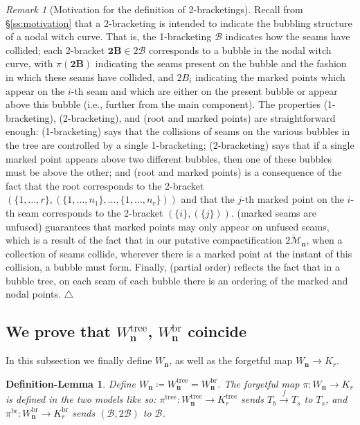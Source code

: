 \documentclass[11pt]{amsart}
\newtheorem{deflem}[theorem]{Definition-Lemma}
\theoremstyle{definition}
\theoremstyle{remark}
\newtheorem{remark}[theorem]{Remark}
\theoremstyle{plain}
\newcommand\cM{\mathcal{M}}
\newcommand\bn{\mathbf{n}}
\newcommand{\btB}{{\mathbf{2B}}}
\newcommand{\sB}{\mathscr{B}}
\newcommand{\stB}{2\mathscr{B}}
\newcommand{\on}{\operatorname}
\newcommand{\tree}{{\on{tree}}}
\newcommand{\br}{{\on{br}}}
\newcommand{\ol}{\overline}
\newcommand{\sr}{\stackrel}
\begin{document}
\begin{remark}[Motivation for the definition of 2-bracketings]
Recall from \S\ref{ss:motivation} that a 2-bracketing is intended to indicate the bubbling structure of a nodal witch curve.
That is, the 1-bracketing $\sB$ indicates how the seams have collided; each 2-bracket $\btB \in \stB$ corresponds to a bubble in the nodal witch curve, with $\pi(\btB)$ indicating the seams present on the bubble and the fashion in which these seams have collided, and $2B_i$ indicating the marked points which appear on the $i$-th seam and which are either on the present bubble or appear above this bubble (i.e., further from the main component).
The properties {\sc (1-bracketing)}, {\sc (2-bracketing)}, and {\sc (root and marked points)} are straightforward enough: {\sc (1-bracketing)} says that the collisions of seams on the various bubbles in the tree are controlled by a single 1-bracketing; {\sc (2-bracketing)} says that if a single marked point appears above two different bubbles, then one of these bubbles must be above the other; and {\sc (root and marked points)} is a consequence of the fact that the root corresponds to the 2-bracket $(\{1,\ldots,r\},(\{1,\ldots,n_1\},\ldots,\{1,\ldots,n_r\}))$ and that the $j$-th marked point on the $i$-th seam corresponds to the 2-bracket $(\{i\},(\{j\}))$.
{\sc (marked seams are unfused)} guarantees that marked points may only appear on unfused seams, which is a result of the fact that in our putative compactification $\ol{2\cM}_\bn$, when a collection of seams collide, wherever there is a marked point at the instant of this collision, a bubble must form.
Finally, {\sc (partial order)} reflects the fact that in a bubble tree, on each seam of each bubble there is an ordering of the marked and nodal points.
\null\hfill$\triangle$
\end{remark}

\subsection{We prove that \texorpdfstring{$W_\bn^\tree$}{Wntree}, \texorpdfstring{$W_\bn^\br$}{Wnbr} coincide}
\label{ss:Wn_iso}


In this subsection we finally define $W_\bn$, as well as the forgetful map $W_\bn \to K_r$.

\begin{deflem}
\label{def:Wn}
\label{p:forgetful}
Define $W_\bn \coloneqq W_\bn^\tree = W_\bn^\br$. \label{p:Wn}
The forgetful map $\pi\colon W_\bn \to K_r$ is defined in the two models like so: $\pi^\tree\colon W_\bn^\tree \to K_r^\tree$ sends $T_b \sr{f}{\to} T_s$ to $T_s$, and $\pi^\br\colon W_\bn^\br \to K_r^\br$ sends $(\sB,\stB)$ to $\sB$.
\end{deflem}
\end{document}
